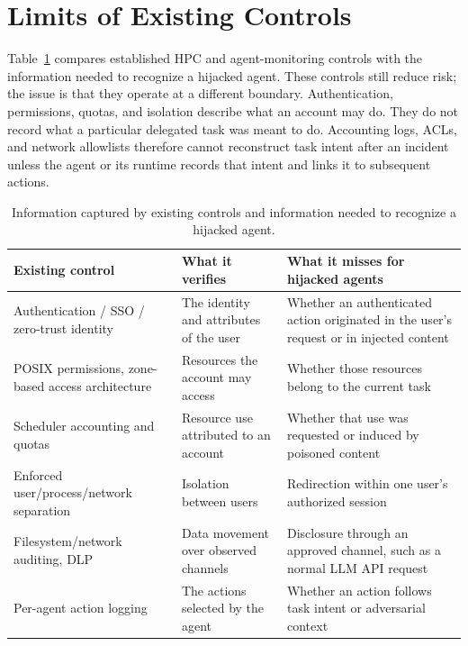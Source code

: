 \section{Limits of Existing Controls}
\label{sec:defense-gap}

Table~\ref{tab:defense-gap} compares established HPC and agent-monitoring controls with the information needed to recognize a hijacked agent. These controls still reduce risk; the issue is that they operate at a different boundary. Authentication, permissions, quotas, and isolation describe what an account may do. They do not record what a particular delegated task was meant to do. Accounting logs, ACLs, and network allowlists therefore cannot reconstruct task intent after an incident unless the agent or its runtime records that intent and links it to subsequent actions.

\begin{table}[H]
\centering
\caption{Information captured by existing controls and information needed to recognize a hijacked agent.}
\label{tab:defense-gap}
\begin{tabularx}{\linewidth}{@{} X X X @{}}
\toprule
\textbf{Existing control} & \textbf{What it verifies} & \textbf{What it misses for hijacked agents} \\
\midrule
Authentication / SSO / zero-trust identity \cite{Alam2024ZeroTrust} & The identity and attributes of the user & Whether an authenticated action originated in the user's request or in injected content \\
POSIX permissions, zone-based access architecture \cite{NIST2024SP800223} & Resources the account may access & Whether those resources belong to the current task \\
Scheduler accounting and quotas & Resource use attributed to an account & Whether that use was requested or induced by poisoned content \\
Enforced user/process/network separation \cite{Prout2024UserSeparation} & Isolation between users & Redirection within one user's authorized session \\
Filesystem/network auditing, DLP & Data movement over observed channels & Disclosure through an approved channel, such as a normal LLM API request \\
Per-agent action logging & The actions selected by the agent & Whether an action follows task intent or adversarial context \\
\bottomrule
\end{tabularx}
\end{table}
